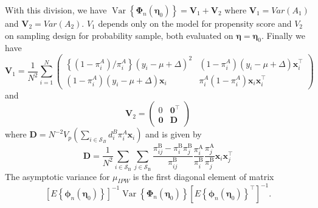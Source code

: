 \documentclass[
  letterpaper,
  DIV=11,
  numbers=noendperiod]{scrreprt}
\begin{document}
With this division, we have
\(\operatorname{Var}\left\{\boldsymbol{\Phi}_n\left(\boldsymbol{\eta}_0\right)\right\}=\mathbf{V}_1+\mathbf{V}_2\)
where \(\mathbf{V}_1 = Var \left(A_1\right)\) and
\(\mathbf{V}_2 = Var \left(A_2\right)\). \(V_1\) depends only on the
model for propensity score and \(V_2\) on sampling design for
probability sample, both evaluated on
\(\boldsymbol{\eta} = \boldsymbol{\eta}_0\). Finally we have \[
\mathbf{V}_1=\frac{1}{N^2} \sum_{i=1}^N\left(\begin{array}{cc}
\left\{\left(1-\pi_i^A\right) / \pi_i^A\right\}\left(y_i-\mu+\Delta\right)^2 & \left(1-\pi_i^A\right)\left(y_i-\mu+\Delta\right) \boldsymbol{x}_i^{\top} \\
\left(1-\pi_i^A\right)\left(y_i-\mu+\Delta\right) \boldsymbol{x}_i & \pi_i^A\left(1-\pi_i^A\right) \boldsymbol{x}_i \boldsymbol{x}_i^{\top}
\end{array}\right)
\] and \[
\mathbf{V}_2=\left(\begin{array}{ll}
0 & \mathbf{0}^{\top} \\
\mathbf{0} & \mathbf{D}
\end{array}\right)
\] where
\(\mathbf{D}=N^{-2} V_p\left(\sum_{i \in \mathcal{S}_B} d_i^B \pi_i^A \boldsymbol{x}_i\right)\)
and is given by \[
\begin{equation}
{\mathbf{D}}=\frac{1}{N^2} \sum_{i \in \mathcal{S}_{\mathrm{B}}} \sum_{j \in \mathcal{S}_{\mathrm{B}}} \frac{\pi_{i j}^{\mathrm{B}}-\pi_i^{\mathrm{B}} \pi_j^{\mathrm{B}}}{\pi_{i j}^{\mathrm{B}}} \frac{{\pi}_i^{\mathrm{A}}}{\pi_i^{\mathrm{B}}} \frac{{\pi}_j^{\mathrm{A}}}{\pi_j^{\mathrm{B}}} \boldsymbol{x}_i \boldsymbol{x}_j^{\top}
\end{equation}
\] The asymptotic variance for \(\mu_{IPW}\) is the first diagonal
element of matrix \[
\left[E\left\{\boldsymbol{\phi}_n\left(\boldsymbol{\eta}_0\right)\right\}\right]^{-1} \operatorname{Var}\left\{\boldsymbol{\Phi}_n\left(\boldsymbol{\eta}_0\right)\right\}\left[E\left\{\boldsymbol{\phi}_n\left(\boldsymbol{\eta}_0\right)\right\}^{\top}\right]^{-1}.
\]
\end{document}
